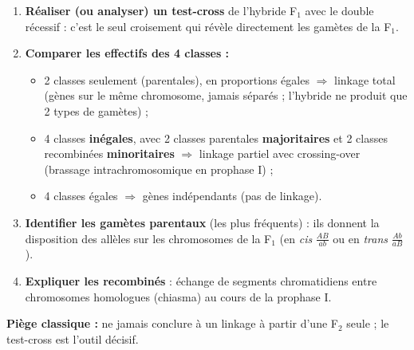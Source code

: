 \documentclass[11pt]{article}
\newcommand{\cle}[1]{{\popxbold\color{popdark}#1}}
\begin{document}
\begin{methode}
\begin{enumerate}
\item \textbf{Réaliser (ou analyser) un test-cross} de l'hybride F$_1$ avec le double récessif : c'est le seul croisement qui révèle directement les gamètes de la F$_1$.
\item \textbf{Comparer les effectifs des 4 classes :}
\begin{itemize}
\item 2 classes seulement (parentales), en proportions égales $\Rightarrow$ \cle{linkage total} (gènes sur le même chromosome, jamais séparés ; l'hybride ne produit que 2 types de gamètes) ;
\item 4 classes \textbf{inégales}, avec 2 classes parentales \textbf{majoritaires} et 2 classes recombinées \textbf{minoritaires} $\Rightarrow$ \cle{linkage partiel} avec \cle{crossing-over} (brassage intrachromosomique en prophase I) ;
\item 4 classes égales $\Rightarrow$ gènes indépendants (pas de linkage).
\end{itemize}
\item \textbf{Identifier les gamètes parentaux} (les plus fréquents) : ils donnent la disposition des allèles sur les chromosomes de la F$_1$ (en \emph{cis} $\frac{AB}{ab}$ ou en \emph{trans} $\frac{Ab}{aB}$).
\item \textbf{Expliquer les recombinés} : échange de segments chromatidiens entre chromosomes homologues (chiasma) au cours de la prophase I.
\end{enumerate}
\textbf{Piège classique :} ne jamais conclure à un linkage à partir d'une F$_2$ seule ; le test-cross est l'outil décisif.
\end{methode}
\end{document}
